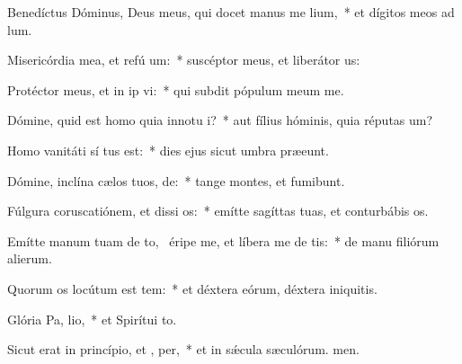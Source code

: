 \item Benedíctus Dóminus, Deus meus, qui docet manus me  lium,~* et dígitos meos ad lum.
\item Misericórdia mea, et refú um:~* suscéptor meus, et liberátor us:
\item Protéctor meus, et in ip vi:~* qui subdit pópulum meum  me.
\item Dómine, quid est homo quia innotu i?~* aut fílius hóminis, quia réputas um?
\item Homo vanitáti sí tus est:~* dies ejus sicut umbra præeunt.
\item Dómine, inclína cælos tuos,  de:~* tange montes, et fumibunt.
\item Fúlgura coruscatiónem, et dissi os:~* emítte sagíttas tuas, et conturbábis os.
\item Emítte manum tuam de to,~\pscross{} éripe me, et líbera me de  tis:~* de manu filiórum alierum.
\item Quorum os locútum est tem:~* et déxtera eórum, déxtera iniquitis.
\item Glória Pa,  lio,~* et Spirítui to.
\item Sicut erat in princípio, et ,  per,~* et in sǽcula sæculórum. men.
